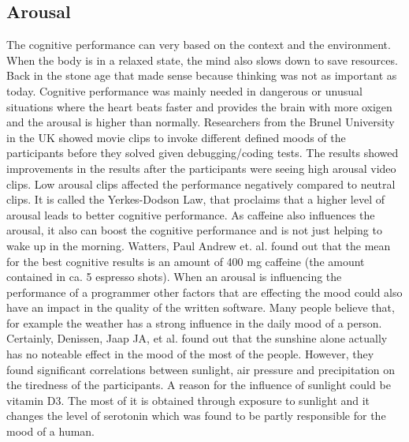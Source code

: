 \subsection{Arousal}
The cognitive performance can very based on the context and the environment. When the body is in a relaxed state, the mind also slows down to save resources. Back in the stone age that made sense because thinking was not as important as today. Cognitive performance was mainly needed in dangerous or unusual situations where the heart beats faster and provides the brain with more oxigen and the arousal is higher than normally.
Researchers from the Brunel University in the UK showed movie clips to invoke different defined moods of the participants before they solved given debugging/coding tests. The results showed improvements in the results after the participants were seeing high arousal video clips. Low arousal clips affected the performance negatively compared to neutral clips. \cite{khan2007mood}
It is called the Yerkes-Dodson Law, that proclaims that a higher level of arousal leads to better cognitive performance. As caffeine also influences the arousal, it also can boost the cognitive performance and is not just helping to wake up in the morning. Watters, Paul Andrew et. al. \cite{watters1997caffeine} found out that the mean for the best cognitive results is an amount of 400 mg caffeine (the amount contained in ca. 5 espresso shots).
\bigbreak
When an arousal is influencing the performance of a programmer other factors that are effecting the mood could also have an impact in the quality of the written software. Many people believe that, for example the weather has a strong influence in the daily mood of a person. Certainly, Denissen, Jaap JA, et al. \cite{denissen2008effects} found out that the sunshine alone actually has no noteable effect in the mood of the most of the people. However, they found significant correlations between sunlight, air pressure and precipitation on the tiredness of the participants.
A reason for the influence of sunlight could be vitamin D3. The most of it is obtained through exposure to sunlight and it changes the level of serotonin which was found to be partly responsible for the mood of a human.

